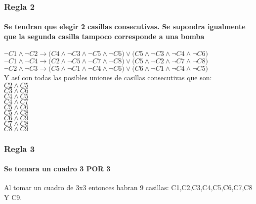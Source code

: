 \documentclass{beamer}
\begin{document}
\begin{frame}
\frametitle{Regla 2}
\framesubtitle{Se tendran que elegir 2 casillas consecutivas. Se supondra igualmente que la segunda casilla tampoco corresponde a una bomba}

$\neg{C1} \wedge{\neg{C2}} \rightarrow {(C4 \wedge{\neg{C3}} \wedge{\neg{C5}} \wedge{\neg{C6})\lor{(C5 \wedge{\neg{C3}} \wedge{\neg{C4}} \wedge{\neg{C6})}}}}$\\
$\neg{C1} \wedge{\neg{C4}} \rightarrow {(C2 \wedge{\neg{C5}} \wedge{\neg{C7}} \wedge{\neg{C8})\lor{(C5 \wedge{\neg{C2}} \wedge{\neg{C7}} \wedge{\neg{C8})}}}}$\\
$\neg{C2} \wedge{\neg{C3}} \rightarrow {(C5 \wedge{\neg{C1}} \wedge{\neg{C4}} \wedge{\neg{C6})\lor{(C6 \wedge{\neg{C1}} \wedge{\neg{C4}} \wedge{\neg{C5})}}}}$\\
Y así con todas las posibles uniones de casillas consecutivas que son:\\
$C2 \wedge{ C5} $\\
$C3 \wedge{ C6} $\\
$C4 \wedge{ C5} $\\
$C4 \wedge{ C7} $\\
$C5 \wedge{ C6} $\\
$C5 \wedge{ C8} $\\
$C6 \wedge{ C9} $\\
$C7 \wedge{ C8} $\\
$C8 \wedge{ C9} $\\
\end{frame}



\begin{frame}
\frametitle{Regla 3}
\framesubtitle{Se tomara un cuadro 3 POR 3}
Al tomar un cuadro de 3x3 entonces habran 9 casillas: C1,C2,C3,C4,C5,C6,C7,C8 Y C9.\\
\end{frame}
\end{document}
